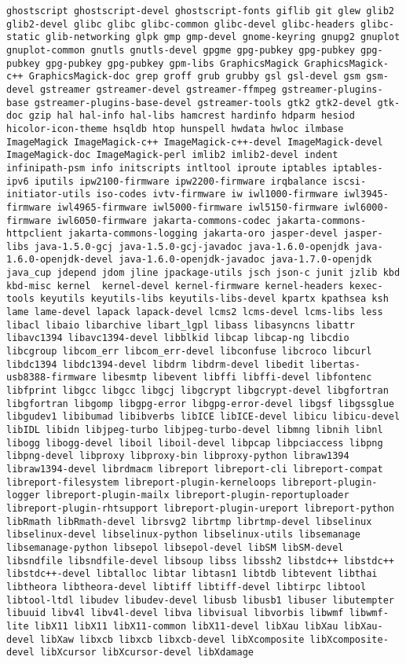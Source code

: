 \begin{lstlisting}
ghostscript ghostscript-devel ghostscript-fonts giflib git glew glib2 glib2-devel glibc glibc glibc-common glibc-devel glibc-headers glibc-static glib-networking glpk gmp gmp-devel gnome-keyring gnupg2 gnuplot gnuplot-common gnutls gnutls-devel gpgme gpg-pubkey gpg-pubkey gpg-pubkey gpg-pubkey gpg-pubkey gpm-libs GraphicsMagick GraphicsMagick-c++ GraphicsMagick-doc grep groff grub grubby gsl gsl-devel gsm gsm-devel gstreamer gstreamer-devel gstreamer-ffmpeg gstreamer-plugins-base gstreamer-plugins-base-devel gstreamer-tools gtk2 gtk2-devel gtk-doc gzip hal hal-info hal-libs hamcrest hardinfo hdparm hesiod hicolor-icon-theme hsqldb htop hunspell hwdata hwloc ilmbase ImageMagick ImageMagick-c++ ImageMagick-c++-devel ImageMagick-devel ImageMagick-doc ImageMagick-perl imlib2 imlib2-devel indent infinipath-psm info initscripts intltool iproute iptables iptables-ipv6 iputils ipw2100-firmware ipw2200-firmware irqbalance iscsi-initiator-utils iso-codes ivtv-firmware iw iwl1000-firmware iwl3945-firmware iwl4965-firmware iwl5000-firmware iwl5150-firmware iwl6000-firmware iwl6050-firmware jakarta-commons-codec jakarta-commons-httpclient jakarta-commons-logging jakarta-oro jasper-devel jasper-libs java-1.5.0-gcj java-1.5.0-gcj-javadoc java-1.6.0-openjdk java-1.6.0-openjdk-devel java-1.6.0-openjdk-javadoc java-1.7.0-openjdk java_cup jdepend jdom jline jpackage-utils jsch json-c junit jzlib kbd kbd-misc kernel  kernel-devel kernel-firmware kernel-headers kexec-tools keyutils keyutils-libs keyutils-libs-devel kpartx kpathsea ksh lame lame-devel lapack lapack-devel lcms2 lcms-devel lcms-libs less libacl libaio libarchive libart_lgpl libass libasyncns libattr libavc1394 libavc1394-devel libblkid libcap libcap-ng libcdio libcgroup libcom_err libcom_err-devel libconfuse libcroco libcurl libdc1394 libdc1394-devel libdrm libdrm-devel libedit libertas-usb8388-firmware libesmtp libevent libffi libffi-devel libfontenc libfprint libgcc libgcc libgcj libgcrypt libgcrypt-devel libgfortran libgfortran libgomp libgpg-error libgpg-error-devel libgsf libgssglue libgudev1 libibumad libibverbs libICE libICE-devel libicu libicu-devel libIDL libidn libjpeg-turbo libjpeg-turbo-devel libmng libnih libnl libogg libogg-devel liboil liboil-devel libpcap libpciaccess libpng libpng-devel libproxy libproxy-bin libproxy-python libraw1394 libraw1394-devel librdmacm libreport libreport-cli libreport-compat libreport-filesystem libreport-plugin-kerneloops libreport-plugin-logger libreport-plugin-mailx libreport-plugin-reportuploader libreport-plugin-rhtsupport libreport-plugin-ureport libreport-python libRmath libRmath-devel librsvg2 librtmp librtmp-devel libselinux libselinux-devel libselinux-python libselinux-utils libsemanage libsemanage-python libsepol libsepol-devel libSM libSM-devel libsndfile libsndfile-devel libsoup libss libssh2 libstdc++ libstdc++ libstdc++-devel libtalloc libtar libtasn1 libtdb libtevent libthai libtheora libtheora-devel libtiff libtiff-devel libtirpc libtool libtool-ltdl libudev libudev-devel libusb libusb1 libuser libutempter libuuid libv4l libv4l-devel libva libvisual libvorbis libwmf libwmf-lite libX11 libX11 libX11-common libX11-devel libXau libXau libXau-devel libXaw libxcb libxcb libxcb-devel libXcomposite libXcomposite-devel libXcursor libXcursor-devel libXdamage 
\end{lstlisting}
